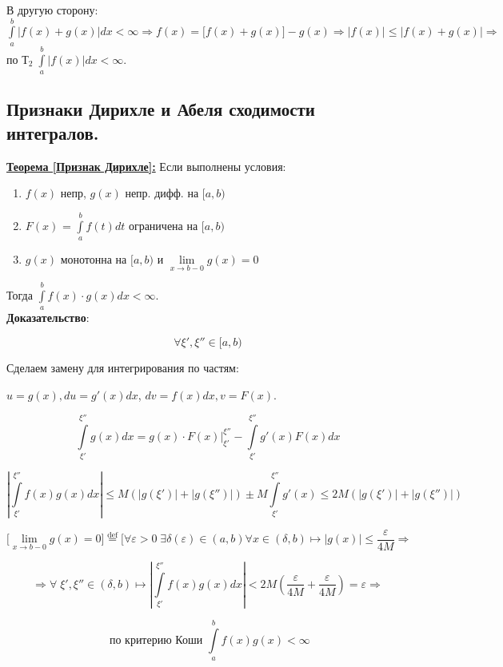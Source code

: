 \documentclass[a4paper,12pt]{article} %
\renewcommand {\leq}{\leqslant}
\begin{document}
В другую сторону: $\int\limits_a^b |f(x) +g(x)| dx < \infty \Rightarrow f(x) = \bigl[f(x) + g(x) \bigr]-g(x) \Rightarrow |f(x)| \leq |f(x) + g(x)| \Rightarrow $ по $Т_2\; \int\limits_a^b |f(x)| dx < \infty$.\\


\subsection{Признаки Дирихле и Абеля сходимости интегралов.}

\underline{\textbf{Теорема [Признак Дирихле]:}} Если выполнены условия:

\begin{enumerate}
    \item $f(x)$ непр, $g(x)$ непр. дифф. на $[a, b)$
    
    \item $F(x)$ = $\int\limits_a^b f(t) dt$ ограничена на $[a, b)$
    
    \item $g(x)$ монотонна на $[a, b)$ и $\lim\limits_{x\rightarrow b-0}g(x) = 0$

\end{enumerate}

Тогда $\int\limits_a^b f(x)\cdot g(x) dx < \infty$.\\

\textbf{Доказательство}:

$$\forall \xi', \xi'' \in [a,b)$$

Сделаем замену для интегрирования по частям: 

$u = g(x), du=g'(x)dx$, $dv=f(x)dx, v=F(x)$.

$$\int\limits_{\xi'}^{\xi''} g(x) dx = g(x)\cdot F(x)\bigg|_{\xi'}^{\xi''} - \int\limits_{\xi'}^{\xi''} g'(x)F(x)dx$$ 

$$|\int\limits_{\xi'}^{\xi''} f(x)g(x)dx|\leq M(|g(\xi')|+|g(\xi'')|) \pm M \int\limits_{\xi'}^{\xi''} g'(x) \leq 2M(|g(\xi')|+|g(\xi'')|)$$

$$\bigl[ \lim\limits_{x\rightarrow b-0}g(x) = 0 \bigr] \stackrel{\text{def}}{=} \bigl[ \forall \varepsilon > 0 \; \exists \delta(\varepsilon) \in (a, b) \forall x\in (\delta, b) \longmapsto |g(x)| \leq \frac{\varepsilon}{4M}  \Rightarrow $$

$$  \Rightarrow \forall \; \xi', \xi'' \in (\delta, b) \longmapsto |\int\limits_{\xi'}^{\xi''} f(x)g(x)dx|<2M(\frac{\varepsilon}{4M}+\frac{\varepsilon}{4M}) = \varepsilon \Rightarrow $$

$$\text{ по критерию Коши } \int\limits_{a}^{b}f(x)g(x)<\infty$$\\\\
\end{document}
